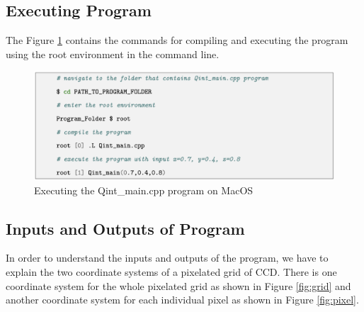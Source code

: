 \documentclass{article}
\begin{document}
\subsection{Executing Program}
The Figure \ref{fig:program} contains the commands for compiling and executing the program using the root environment in the command line.

\begin{figure}[H]
    \centering
    \includegraphics[width=1\linewidth]{images/program.png}
    \caption{Executing the Qint\_main.cpp program on MacOS}
    \label{fig:program}
\end{figure}


\subsection{Inputs and Outputs of Program}

In order to understand the inputs and outputs of the program, we have to explain the two coordinate systems of a pixelated grid of CCD. There is one coordinate system for the whole pixelated grid as shown in Figure \ref{fig:grid} and another coordinate system for each individual pixel as shown in Figure \ref{fig:pixel}. 
\end{document}
